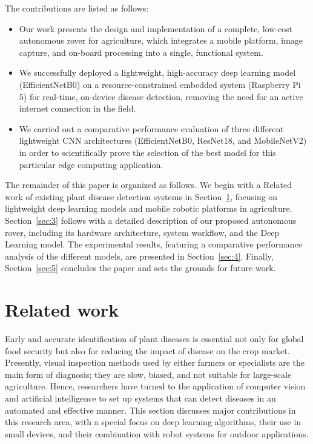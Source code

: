 \documentclass[pdflatex,sn-mathphys-num,iicol]{sn-jnl} %
\theoremstyle{thmstyleone}
\theoremstyle{thmstyletwo}
\theoremstyle{thmstylethree}
\begin{document}
The contributions are listed as follows:

\begin{itemize}
    \item Our work presents the design and implementation of a complete, low-cost autonomous rover for agriculture, which integrates a mobile platform, image capture, and on-board processing into a single, functional system.

    \item We successfully deployed a lightweight, high-accuracy deep learning model (EfficientNetB0) on a resource-constrained embedded system (Raspberry Pi 5) for real-time, on-device disease detection, removing the need for an active internet connection in the field.

    \item We carried out a comparative performance evaluation of three different lightweight CNN architectures (EfficientNetB0, ResNet18, and MobileNetV2) in order to scientifically prove the selection of the best model for this particular edge computing application.
\end{itemize}

The remainder of this paper is organized as follows. We begin with a Related work of existing plant disease detection systems in Section~\ref{sec:2}, focusing on lightweight deep learning models and mobile robotic platforms in agriculture. Section~\ref{sec:3} follows with a detailed description of our proposed autonomous rover, including its hardware architecture, system workflow, and the Deep Learning model. The experimental results, featuring a comparative performance analysis of the different models, are presented in Section~\ref{sec:4}. Finally, Section~\ref{sec:5} concludes the paper and sets the grounds
 for future work.

\section{Related work}
\label{sec:2}

Early and accurate identification of plant diseases is essential not only for global food security but also for reducing the impact of disease on the crop market. Presently, visual inspection methods used by either farmers or specialists are the main form of diagnosis; they are slow, biased, and not suitable for large-scale agriculture. Hence, researchers have turned to the application of computer vision and artificial intelligence to set up systems that can detect diseases in an automated and effective manner. This section discusses major contributions in this research area, with a special focus on deep learning algorithms, their use in small devices, and their combination with robot systems for outdoor applications.
\end{document}
